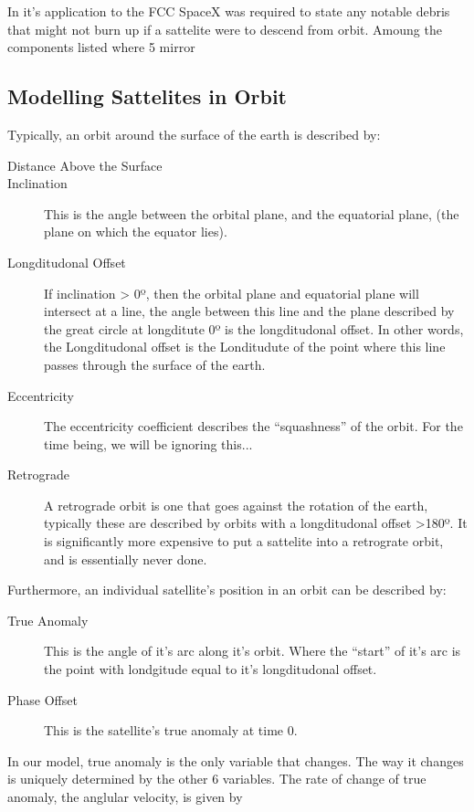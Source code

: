 \documentclass[12pt]{article}
\begin{document}
In it's application to the FCC SpaceX was required to state any notable debris that might not burn up if a sattelite were to descend from orbit. Amoung the components listed where 5 mirror 

\subsection{Modelling Sattelites in Orbit}

Typically, an orbit around the surface of the earth is described by:

\begin{description}
\item[Distance Above the Surface]
\item[Inclination]
This is the angle between the orbital plane, and the equatorial plane, (the plane on which the equator lies).
\item[Longditudonal Offset]
If inclination > 0º, then the orbital plane and equatorial plane will intersect at a line, the angle between this line and the plane described by the great circle at longditute 0º is the longditudonal offset. In other words, the Longditudonal offset is the Londitudute of the point where this line passes through the surface of the earth.
\item[Eccentricity]
The eccentricity coefficient describes the “squashness” of the orbit. For the time being, we will be ignoring this...
\item[Retrograde]
A retrograde orbit is one that goes against the rotation of the earth, typically these are described by orbits with a longditudonal offset >180º. It is significantly more expensive to put a sattelite into a retrograte orbit, and is essentially never done.
\end{description}

Furthermore, an individual satellite's position in an orbit can be described by:

\begin{description}
\item[True Anomaly]
This is the angle of it’s arc along it’s orbit. Where the “start” of it’s arc is the point with londgitude equal to it’s longditudonal offset.
\item[Phase Offset]
This is the satellite's true anomaly at time 0.
\end{description}

In our model, true anomaly is the only variable that changes. The way it changes is uniquely determined by the other 6 variables. The rate of change of true anomaly, the anglular velocity, is given by
\end{document}
